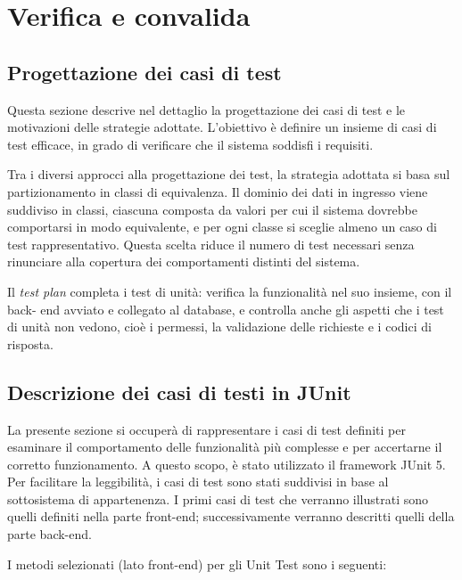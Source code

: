 \chapter{Verifica e convalida} %

\label{Chapter3} %

\section{Progettazione dei casi di test}

Questa sezione descrive nel dettaglio la progettazione dei casi di test e le motivazioni 
delle strategie adottate. L’obiettivo è definire un insieme di casi di test 
efficace, in grado di verificare che il sistema soddisfi i requisiti.

Tra i diversi approcci alla progettazione dei test, la strategia adottata 
si basa sul partizionamento in classi di equivalenza. Il dominio dei dati in 
ingresso viene suddiviso in classi, ciascuna composta da valori per cui il 
sistema dovrebbe comportarsi in modo equivalente, e per ogni classe si sceglie 
almeno un caso di test rappresentativo. Questa scelta riduce il numero di test 
necessari senza rinunciare alla copertura dei comportamenti distinti del sistema.

Il \textit{test plan} completa i test di unità: verifica la funzionalità nel 
suo insieme, con il back-
end avviato e collegato al database, e controlla anche gli aspetti che i 
test di unità non
vedono, cioè i permessi, la validazione delle richieste e i codici di risposta.

\section{Descrizione dei casi di testi in JUnit}
La presente sezione si occuperà di rappresentare i casi di test definiti per esaminare il comportamento delle funzionalità più complesse e per accertarne il corretto funzionamento. A questo scopo, è stato utilizzato il framework JUnit 5. \\
\indent Per facilitare la leggibilità, i casi di test sono stati suddivisi in base al sottosistema di appartenenza. I primi casi di test che verranno illustrati sono quelli definiti nella parte front-end; successivamente verranno descritti quelli della parte back-end.

I metodi selezionati (lato front-end) per gli Unit Test sono i seguenti:


